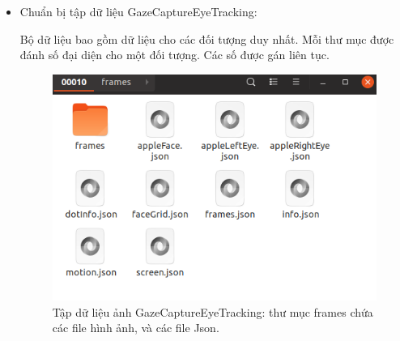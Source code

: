 \begin{itemize}
\item Chuẩn bị tập dữ liệu  GazeCaptureEyeTracking:\cite{GazeCaptureEyeTracking}

 Bộ dữ liệu bao gồm dữ liệu cho các đối tượng duy nhất. Mỗi thư mục được đánh số đại diện cho một đối tượng. Các số được gán liên tục.

 \begin{center}
    \begin{figure}[h!]
    \begin{center}
     \includegraphics[scale=0.5]{img/GazeCaptureEyeTracking_JSon.png}
    \end{center}
    \caption{Tập dữ liệu ảnh GazeCaptureEyeTracking: thư mục frames chứa các file hình ảnh, và các file Json.}
    \label{refhinh20}
    \end{figure}
\end{center}


\end{itemize}
